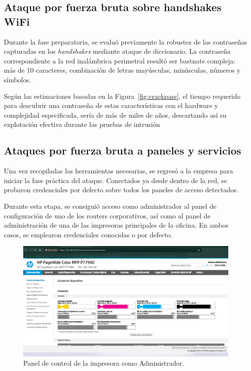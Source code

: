 \documentclass[a4paper, 11pt]{article}
\begin{document}
\subsection*{Ataque por fuerza bruta sobre handshakes WiFi}

Durante la fase preparatoria, se evaluó previamente la robustez de las contraseñas capturadas en los \textit{handshakes} mediante ataque de diccionario. La contraseña correspondiente a la red inalámbrica perimetral resultó ser bastnate compleja: más de 10 caracteres, combinación de letras mayúsculas, minúsculas, números y símbolos.

Según las estimaciones basadas en la Figura~\ref{fig:crackpass}, el tiempo requerido para descubrir una contraseña de estas características con el hardware y complejidad especificada, sería de más de miles de años, descartando así su explotación efectiva durante las pruebas de intrusión


\subsection*{Ataques por fuerza bruta a paneles y servicios}

Una vez recopiladas las herramientas necesarias, se regresó a la empresa para iniciar la fase práctica del ataque. Conectados ya desde dentro de la red, se probaron credenciales por defecto sobre todos los paneles de acceso detectados.

Durante esta etapa, se consiguió acceso como administrador al panel de configuración de uno de los routers corporativos, así como al panel de administración de una de las impresoras principales de la oficina. En ambos casos, se emplearon credenciales conocidas o por defecto.


\begin{figure}[H]
    \centering
    \includegraphics[width=1.1\textwidth]{images/panel_hp.png}
    \caption{Panel de control de la impresora como Administrador.}
    \label{fig:panel_impresora}
\end{figure}
\end{document}
